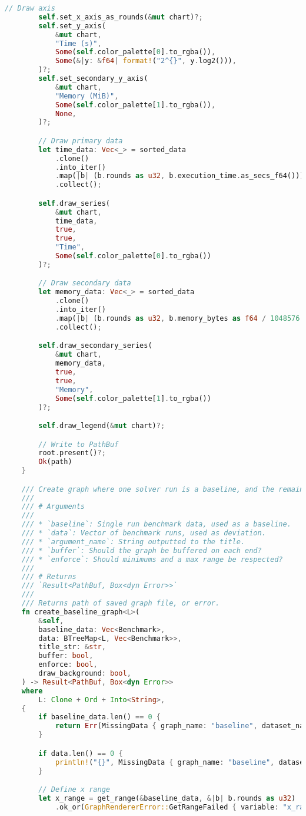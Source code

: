 \begin{lstlisting}[language=rust, caption={graphing/graphs.rs}]
		// Draw axis
		self.set_x_axis_as_rounds(&mut chart)?;
		self.set_y_axis(
			&mut chart,
			"Time (s)",
			Some(self.color_palette[0].to_rgba()),
			Some(&|y: &f64| format!("2^{}", y.log2())),
		)?;
		self.set_secondary_y_axis(
			&mut chart,
			"Memory (MiB)",
			Some(self.color_palette[1].to_rgba()),
			None,
		)?;

		// Draw primary data
		let time_data: Vec<_> = sorted_data
			.clone()
			.into_iter()
			.map(|b| (b.rounds as u32, b.execution_time.as_secs_f64()))
			.collect();

		self.draw_series(
			&mut chart,
			time_data,
			true,
			true,
			"Time",
			Some(self.color_palette[0].to_rgba())
		)?;

		// Draw secondary data
		let memory_data: Vec<_> = sorted_data
			.clone()
			.into_iter()
			.map(|b| (b.rounds as u32, b.memory_bytes as f64 / 1048576.0))
			.collect();

		self.draw_secondary_series(
			&mut chart,
			memory_data,
			true,
			true,
			"Memory",
			Some(self.color_palette[1].to_rgba())
		)?;

		self.draw_legend(&mut chart)?;

		// Write to PathBuf
		root.present()?;
		Ok(path)
	}

	/// Create graph where one solver run is a baseline, and the remaining data is compared against it.
	///
	/// # Arguments
	///
	/// * `baseline`: Single run benchmark data, used as a baseline.
	/// * `data`: Vector of benchmark runs, used as deviation.
	/// * `argument_name`: String outputted to the title.
	/// * `buffer`: Should the graph be buffered on each end?
	/// * `enforce`: Should minimums and a max range be respected?
	///
	/// # Returns
	/// `Result<PathBuf, Box<dyn Error>>`
	///
	/// Returns path of saved graph file, or error.
	fn create_baseline_graph<L>(
		&self,
		baseline_data: Vec<Benchmark>,
		data: BTreeMap<L, Vec<Benchmark>>,
		title_str: &str,
		buffer: bool,
		enforce: bool,
		draw_background: bool,
	) -> Result<PathBuf, Box<dyn Error>>
	where
		L: Clone + Ord + Into<String>,
	{
		if baseline_data.len() == 0 {
			return Err(MissingData { graph_name: "baseline", dataset_name: "baseline" }.into());
		}

		if data.len() == 0 {
			println!("{}", MissingData { graph_name: "baseline", dataset_name: "data" });
		}

		// Define x range
		let x_range = get_range(&baseline_data, &|b| b.rounds as u32)
			.ok_or(GraphRendererError::GetRangeFailed { variable: "x_range" })?;


\end{lstlisting}
